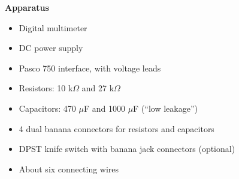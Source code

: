 \makelabheader %

\vspace{0.1in}
\textbf{Apparatus} 
\begin{itemize}%
\setlength\itemsep{-4pt}
\setlength\topsep{-6pt}
\setlength\partopsep{-6pt}
\vspace{-0.2in}  %
\item Digital multimeter 
\item DC power supply 
\item Pasco 750 interface, with voltage leads
\item Resistors: 10 k$\Omega$ and 27 k$\Omega$
\item Capacitors: 470 $\mu$F and 1000 $\mu$F (``low leakage'')
\item 4 dual banana connectors for resistors and capacitors
\item DPST knife switch with banana jack connectors (optional)
\item About six connecting wires
\end{itemize}

